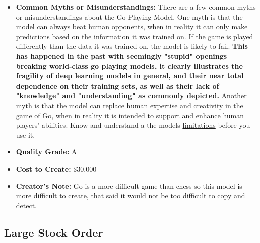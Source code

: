 \begin{itemize}
    \item \textbf{Common Myths or Misunderstandings:} There are a few common myths or misunderstandings about the Go Playing Model. One myth is that the model can always beat human opponents, when in reality it can only make predictions based on the information it was trained on. If the game is played differently than the data it was trained on, the model is likely to fail. \textbf{This has happened in the past with seemingly "stupid" openings breaking world-class go playing models, it clearly illustrates the fragility of deep learning models in general, and their near total dependence on their training sets, as well as their lack of "knowledge" and "understanding" as commonly depicted.} Another myth is that the model can replace human expertise and creativity in the game of Go, when in reality it is intended to support and enhance human players' abilities. Know and understand a the models \hyperref[sec:limits]{limitations} before you use it.
    \item \textbf{Quality Grade:} A
    \item \textbf{Cost to Create:} \$30,000
    \item \textbf{Creator's Note:} Go is a more difficult game than chess so this model is more difficult to create, that said it would not be too difficult to copy and detect.
\end{itemize}



\subsection{Large Stock Order}

